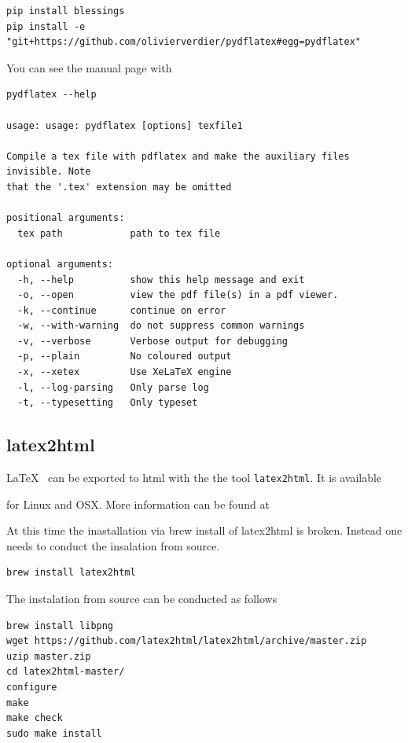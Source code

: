\begin{verbatim}
pip install blessings
pip install -e "git+https://github.com/olivierverdier/pydflatex#egg=pydflatex"
\end{verbatim}

You can see the manual page with 

\begin{verbatim}
pydflatex --help

usage: usage: pydflatex [options] texfile1

Compile a tex file with pdflatex and make the auxiliary files invisible. Note
that the '.tex' extension may be omitted

positional arguments:
  tex path            path to tex file

optional arguments:
  -h, --help          show this help message and exit
  -o, --open          view the pdf file(s) in a pdf viewer.
  -k, --continue      continue on error
  -w, --with-warning  do not suppress common warnings
  -v, --verbose       Verbose output for debugging
  -p, --plain         No coloured output
  -x, --xetex         Use XeLaTeX engine
  -l, --log-parsing   Only parse log
  -t, --typesetting   Only typeset
\end{verbatim}

\subsection{latex2html}

\LaTeX~ can be exported to html with the the tool
\verb|latex2html|. It is available 

for Linux and OSX. More information can be found at



\begin{WARNING}
At this time the inastallation via brew install of latex2html is
broken. Instead one needs to conduct the insalation from source.

\begin{verbatim}
brew install latex2html
\end{verbatim}
\end{WARNING} 

The instalation from source can be conducted as follows

\begin{verbatim}
brew install libpng
wget https://github.com/latex2html/latex2html/archive/master.zip
uzip master.zip 
cd latex2html-master/
configure
make
make check
sudo make install
\end{verbatim}

